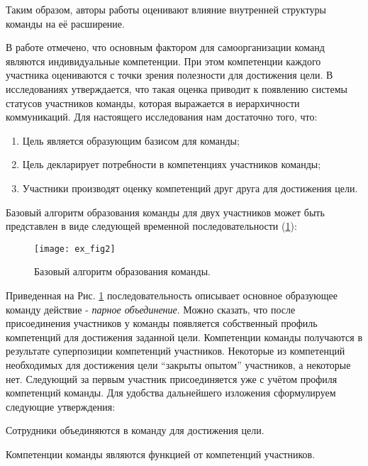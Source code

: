 Таким образом, авторы работы \cite{guimera2005team} оценивают влияние внутренней структуры команды на её расширение.

В работе \cite{moe2009overcoming} отмечено, что основным фактором для самоорганизации команд являются индивидуальные компетенции.
При этом компетенции каждого участника оцениваются с точки зрения полезности для достижения цели. 
В исследованиях \cite{berger1972status,berger1980status} утверждается, что такая оценка приводит к появлению системы статусов участников команды, которая выражается в иерархичности коммуникаций. 
Для настоящего исследования нам достаточно того, что:
\begin{enumerate}
\tightlist
\item  Цель является образующим базисом для команды;
\item  Цель декларирует потребности в компетенциях участников команды;
\item  Участники производят оценку компетенций друг друга для достижения цели.
\end{enumerate}

Базовый алгоритм образования команды для двух участников может быть представлен в виде следующей временной последовательности (\ref{ex:fig2}):

\begin{figure}[H]
  \centering
    \texttt{[image: ex\_fig2]}
  \label{ex:fig2}
  \caption{Базовый алгоритм образования команды.}
\end{figure}


Приведенная на Рис. \ref{ex:fig2} последовательность описывает основное образующее команду действие - \textit{парное объединение}.
Можно сказать, что после присоединения участников у команды появляется собственный профиль компетенций для достижения заданной цели. 
Компетенции команды получаются в результате суперпозиции компетенций участников. 
Некоторые из компетенций необходимых для достижения цели ``закрыты опытом'' участников, а некоторые нет.
Следующий за первым участник присоединяется уже с учётом профиля компетенций команды. 
Для удобства дальнейшего изложения сформулируем следующие утверждения:

\begin{state} \label{state:1}
Сотрудники объединяются в команду для достижения цели.
\end{state}

\begin{state} \label{state:2}
Компетенции команды являются функцией от компетенций участников.
\end{state}

